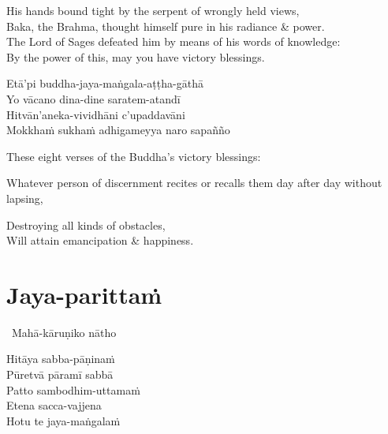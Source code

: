 \begin{english-verses}
  His hands bound tight by the serpent of wrongly held views,\\
  Baka, the Brahma, thought himself pure in his radiance \& power.\\
  The Lord of Sages defeated him by means of his words of knowledge:\\
  By the power of this, may you have victory blessings.
\end{english-verses}

\begin{pali-hang-continued}
  Etā'pi buddha-jaya-maṅgala-aṭṭha-gāthā\\
  Yo vācano dina-dine saratem-atandī\\
  Hitvān'aneka-vividhāni c'upaddavāni\\
  Mokkhaṁ sukhaṁ adhigameyya naro sapañño
\end{pali-hang-continued}

\begin{english-verses}
  These eight verses of the Buddha's victory blessings:
  \begin{english-hangtogether-verses}
    Whatever person of discernment recites or recalls them day after day without lapsing,
  \end{english-hangtogether-verses}
  Destroying all kinds of obstacles,\\
  Will attain emancipation \& happiness.
\end{english-verses}

\suttaRef{[Trad]}

\section{Jaya-parittaṁ}
\label{jaya-parittam}

\begin{pali-leader}
  \anglebracketleft\ \hspace{-0.5mm}Mahā-kāruṇiko nātho \hspace{-0.5mm}\anglebracketright\
\end{pali-leader}
\begin{pali-hangtogether}
  Hitāya sabba-pāṇinaṁ\\
  Pūretvā pāramī sabbā\\
  Patto sambodhim-uttamaṁ\\
  Etena sacca-vajjena\\
  Hotu te jaya-maṅgalaṁ
\end{pali-hangtogether}

